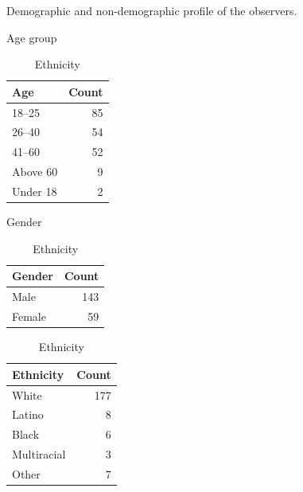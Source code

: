 \begin{table}[htbp]
    \centering
    \caption{Demographic and non-demographic profile of the observers.}
    \label{tab:demographics}

    \begin{subtable}{0.3\textwidth}
        \centering
        \caption{Age group}
        \begin{tabular}{lr}
            \hline
            \textbf{Age} & \textbf{Count} \\
            \hline
            18--25 & 85 \\
            26--40 & 54 \\
            41--60 & 52 \\
            Above 60 & 9 \\
            Under 18 & 2 \\
            \hline
        \end{tabular}
    \end{subtable}
    \hfill
    \begin{subtable}{0.3\textwidth}
        \centering
        \caption{Gender}
        \begin{tabular}{lr}
            \hline
            \textbf{Gender} & \textbf{Count} \\
            \hline
            Male & 143 \\
            Female & 59 \\
            \hline
        \end{tabular}
    \end{subtable}
    \hfill
    \begin{subtable}{0.3\textwidth}
        \centering
        \caption{Ethnicity}
        \begin{tabular}{lr}
            \hline
            \textbf{Ethnicity} & \textbf{Count} \\
            \hline
            White & 177 \\
            Latino & 8 \\
            Black & 6 \\
            Multiracial & 3 \\
            Other & 7 \\
            \hline
        \end{tabular}
    \end{subtable}

    \vfill


\end{table}
